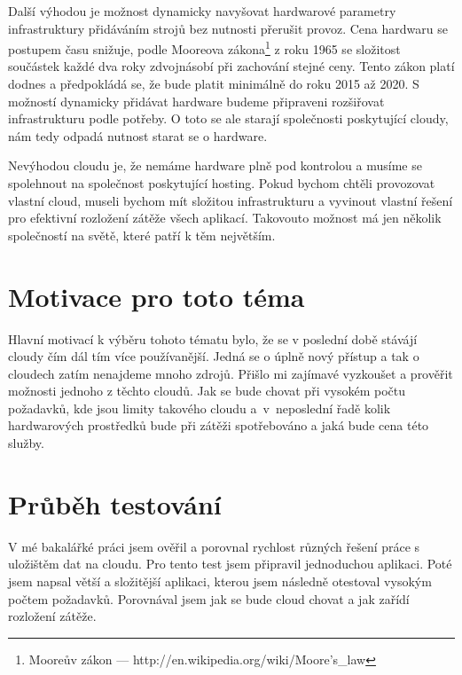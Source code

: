 Další výhodou je možnost dynamicky navyšovat hardwarové parametry infrastruktury přidáváním strojů bez nutnosti přerušit provoz. Cena hardwaru se postupem času snižuje, podle Mooreova zákona\footnote{Mooreův zákon --- http://en.wikipedia.org/wiki/Moore's\_law} z roku 1965 se složitost součástek každé dva roky zdvojnásobí při zachování stejné ceny. Tento zákon platí dodnes a předpokládá se, že bude platit minimálně do roku 2015 až 2020. S možností dynamicky přidávat hardware budeme připraveni rozšiřovat infrastrukturu podle potřeby. O toto se ale starají společnosti poskytující cloudy, nám tedy odpadá nutnost starat se o hardware. 

Nevýhodou cloudu je, že nemáme hardware plně pod kontrolou a musíme se spolehnout na společnost poskytující hosting. Pokud bychom chtěli provozovat vlastní cloud, museli bychom mít složitou infrastrukturu a vyvinout vlastní řešení pro efektivní rozložení zátěže všech aplikací. Takovouto možnost má jen několik společností na světě, které patří k těm největším.

\section{Motivace pro toto téma}
Hlavní motivací k výběru tohoto tématu bylo, že se v poslední době stávájí cloudy čím dál tím více používanější. Jedná se o úplně nový přístup a tak o cloudech zatím nenajdeme mnoho zdrojů. Přišlo mi zajímavé vyzkoušet a prověřit možnosti jednoho z těchto cloudů. Jak se bude chovat při vysokém počtu požadavků, kde jsou limity takového cloudu a~v~neposlední řadě kolik hardwarových prostředků bude při zátěži spotřebováno a jaká bude cena této služby.

\section{Průběh testování}
V mé bakalářké práci jsem ověřil a porovnal rychlost různých řešení práce s uložištěm dat na cloudu. Pro tento test jsem připravil jednoduchou aplikaci. Poté jsem napsal větší a složitější aplikaci, kterou jsem následně otestoval vysokým počtem požadavků. Porovnával jsem jak se bude cloud chovat a jak zařídí rozložení zátěže.
